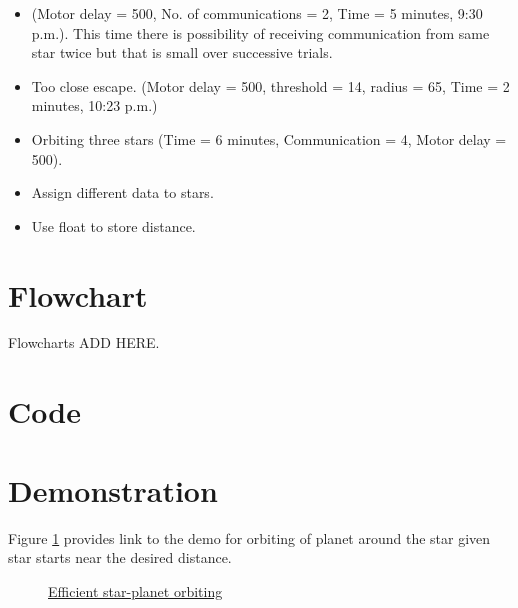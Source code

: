 \documentclass{report}[12pt]
\begin{document}
\begin{itemize}
    \item (Motor delay = 500, No. of communications = 2, Time = 5 minutes, 9:30 p.m.). This time there is possibility of receiving communication from same star twice but that is small over successive trials.
    \item Too close escape. (Motor delay = 500, threshold = 14, radius = 65, Time = 2 minutes, 10:23 p.m.)
    \item Orbiting three stars (Time = 6 minutes, Communication = 4, Motor delay = 500).
    \item Assign different data to stars.
    \item Use float to store distance.
\end{itemize}
\section{Flowchart}
Flowcharts ADD HERE.

\section{Code}



\section{Demonstration}
Figure \ref{fig:efficient_star_planet_orbiting} provides link to the demo for orbiting of planet around the star given star starts near the desired distance.
\begin{figure}[H]
    \centering
    \caption{\href{https://youtu.be/LRgOzhAJI1k}{Efficient star-planet orbiting}}
    \label{fig:efficient_star_planet_orbiting}
\end{figure}
\end{document}
